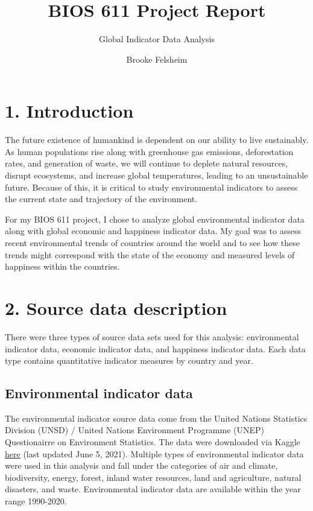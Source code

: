 \documentclass[
]{article}
\title{BIOS 611 Project Report}
\subtitle{Global Indicator Data Analysis}
\author{Brooke Felsheim}
\date{}
\begin{document}
\maketitle

\hypertarget{introduction}{%
\section{1. Introduction}\label{introduction}}

The future existence of humankind is dependent on our ability to live
sustainably. As human populations rise along with greenhouse gas
emissions, deforestation rates, and generation of waste, we will
continue to deplete natural resources, disrupt ecosystems, and increase
global temperatures, leading to an unsustainable future. Because of
this, it is critical to study environmental indicators to assess the
current state and trajectory of the environment.

For my BIOS 611 project, I chose to analyze global environmental
indicator data along with global economic and happiness indicator data.
My goal was to assess recent environmental trends of countries around
the world and to see how these trends might correspond with the state of
the economy and measured levels of happiness within the countries.

\hypertarget{source-data-description}{%
\section{2. Source data description}\label{source-data-description}}

There were three types of source data sets used for this analysis:
environmental indicator data, economic indicator data, and happiness
indicator data. Each data type contains quantitative indicator measures
by country and year.

\hypertarget{environmental-indicator-data}{%
\subsection{Environmental indicator
data}\label{environmental-indicator-data}}

The environmental indicator source data come from the United Nations
Statistics Division (UNSD) / United Nations Environment Programme (UNEP)
Questionairre on Environment Statistics. The data were downloaded via
Kaggle
\href{https://www.kaggle.com/ruchi798/global-environmental-indicators}{here}
(last updated June 5, 2021). Multiple types of environmental indicator
data were used in this analysis and fall under the categories of air and
climate, biodiversity, energy, forest, inland water resources, land and
agriculture, natural disasters, and waste. Environmental indicator data
are available within the year range 1990-2020.
\end{document}
